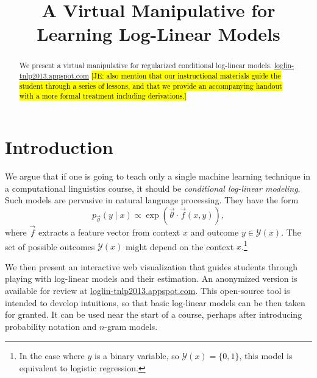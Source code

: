 \documentclass[11pt,letterpaper]{article}
\title{A Virtual Manipulative for Learning Log-Linear Models}
\author{
 }
\date{}
\newcommand{\Note}[1]{}
\renewcommand{\Note}[1]{\hl{[#1]}}
\newcommand{\NoteSigned}[3]{{\sethlcolor{#2}\Note{#1: #3}}}
\newcommand{\NoteJE}[1]{\NoteSigned{JE}{LightGreen}{#1}}
\newcommand{\WhereToFind}[0]{\url{loglin-tnlp2013.appspot.com}}
\begin{document}
\maketitle

\begin{abstract}
We present a virtual manipulative for regularized conditional log-linear models. \WhereToFind{}
\NoteJE{also mention that our instructional materials guide the student through a series of lessons, and that we provide an accompanying handout with a more formal treatment including derivations.}
\end{abstract}

\section{Introduction}\label{sec:intro}

We argue that if one is going to teach only a single machine learning
technique in a computational linguistics course, it should be {\em
  conditional log-linear modeling}.  Such models are pervasive in
natural language processing.  They have the form
\begin{equation}\label{eqn:loglin}
p_{\vec{\theta}}(y \mid x) \propto \exp{\left(\vec{\theta} \cdot \vec{f}\left(x,y\right)\right)},
\end{equation}
where $\vec{f}$ extracts a feature vector from context $x$ and
outcome $y \in \mathcal{Y}(x)$.  The set of possible
outcomes $\mathcal{Y}(x)$ might depend on the context $x$.\footnote{In the
  case where $y$ is a binary variable, so $\mathcal{Y}(x)=\{0,1\}$,
  this model is equivalent to logistic regression.}


We then present an interactive web visualization that guides students
through playing with log-linear models and their estimation. An
anonymized version is available for review at \WhereToFind{}.  This
open-source tool is intended to develop intuitions, so that basic
log-linear models can be then taken for granted.  It can be used near
the start of a course, perhaps after introducing probability notation
and $n$-gram models. 
\end{document}
